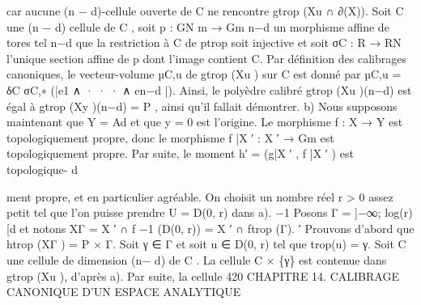 \documentclass[
  10pt,
]{article}
\newenvironment{Shaded}{}{}
\newcommand{\NormalTok}[1]{#1}
\begin{document}
\begin{Shaded}
\begin{Highlighting}[]
\NormalTok{car aucune (n − d){-}cellule ouverte de C ne rencontre gtrop (Xu ∩ ∂(X)).}
\NormalTok{  Soit C une (n − d) cellule de C , soit p : GN  m → Gm}
\NormalTok{                                                         n−d}
\NormalTok{                                                              un morphisme affine de tores tel}
\NormalTok{                                                              n−d}
\NormalTok{que la restriction à C de ptrop soit injective et soit σC : R     → RN l’unique section affine}
\NormalTok{de p dont l’image contient C. Par définition des calibrages canoniques, le vecteur{-}volume}
\NormalTok{µC,u de gtrop (Xu ) sur C est donné par}
\NormalTok{                               µC,u = δC σC,∗ (|e1 ∧ · · · ∧ en−d |).}
\NormalTok{Ainsi, le polyèdre calibré gtrop (Xu )(n−d) est égal à gtrop (Xy )(n−d) = P , ainsi qu’il fallait}
\NormalTok{démontrer.}
\NormalTok{  b) Nous supposons maintenant que Y = Ad et que y = 0 est l’origine.}
\NormalTok{  Le morphisme f : X → Y est topologiquement propre, donc le morphisme f |X ′ : X ′ →}
\NormalTok{Gm est topologiquement propre. Par suite, le moment h′ = (g|X ′ , f |X ′ ) est topologique{-}}
\NormalTok{  d}

\NormalTok{ment propre, et en particulier agréable.}
\NormalTok{  On choisit un nombre réel r \textgreater{} 0 assez petit tel que l’on puisse prendre U = D(0, r)}
\NormalTok{dans a).}
\NormalTok{                                                                               −1}
\NormalTok{  Posons Γ = ]−∞; log(r)[d et notons XΓ = X ′ ∩ f −1 (D(0, r)) = X ′ ∩ ftrop      (Γ).}
\NormalTok{                           ′}
\NormalTok{  Prouvons d’abord que htrop (XΓ ) = P × Γ.}
\NormalTok{  Soit γ ∈ Γ et soit u ∈ D(0, r) tel que trop(u) = γ. Soit C une cellule de dimension (n−}
\NormalTok{d) de C . La cellule C × \{γ\} est contenue dans gtrop (Xu ), d’après a). Par suite, la cellule}
\NormalTok{420           CHAPITRE 14. CALIBRAGE CANONIQUE D’UN ESPACE ANALYTIQUE}


\end{Highlighting}
\end{Shaded}
\end{document}
